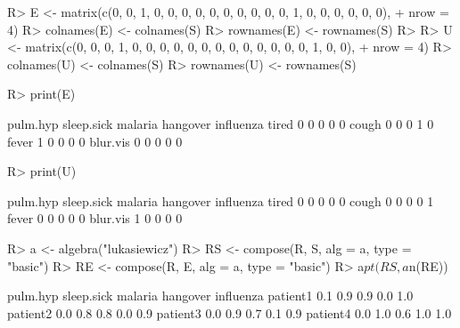 \documentclass{article}\usepackage[]{graphicx}\usepackage[]{color}
\begin{document}
\begin{Schunk}
\begin{Sinput}
R> E <- matrix(c(0, 0, 1, 0, 0, 0, 0, 0, 0, 0, 0, 0, 0, 1, 0, 0, 0, 0, 0, 0), 
+      nrow = 4)
R> colnames(E) <- colnames(S)
R> rownames(E) <- rownames(S)
R> 
R> U <- matrix(c(0, 0, 0, 1, 0, 0, 0, 0, 0, 0, 0, 0, 0, 0, 0, 0, 0, 1, 0, 0), 
+      nrow = 4)
R> colnames(U) <- colnames(S)
R> rownames(U) <- rownames(S)
\end{Sinput}
\end{Schunk}

\begin{Schunk}
% --begin: "comp.e"
\begin{Sinput}
R> print(E)
\end{Sinput}
\begin{Soutput}
         pulm.hyp sleep.sick malaria hangover influenza
tired           0          0       0        0         0
cough           0          0       0        1         0
fever           1          0       0        0         0
blur.vis        0          0       0        0         0
\end{Soutput}
%
% --end: "comp.e"
\end{Schunk}

\begin{Schunk}
% --begin: "comp.u"
\begin{Sinput}
R> print(U)
\end{Sinput}
\begin{Soutput}
         pulm.hyp sleep.sick malaria hangover influenza
tired           0          0       0        0         0
cough           0          0       0        0         1
fever           0          0       0        0         0
blur.vis        1          0       0        0         0
\end{Soutput}
%
% --end: "comp.u"
\end{Schunk}

\begin{Schunk}
% --begin: "comp.circ.excl"
\begin{Sinput}
R> a <- algebra("lukasiewicz")
R> RS <- compose(R, S, alg = a, type = "basic")
R> RE <- compose(R, E, alg = a, type = "basic")
R> a$pt(RS, a$n(RE))
\end{Sinput}
\begin{Soutput}
         pulm.hyp sleep.sick malaria hangover influenza
patient1      0.1        0.9     0.9      0.0       1.0
patient2      0.0        0.8     0.8      0.0       0.9
patient3      0.0        0.9     0.7      0.1       0.9
patient4      0.0        1.0     0.6      1.0       1.0
\end{Soutput}
%
% --end: "comp.circ.excl"
\end{Schunk}
\end{document}
